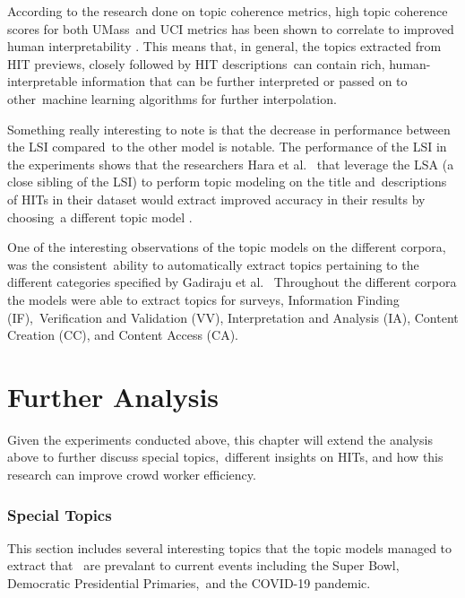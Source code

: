 \documentclass[letterpaper,12pt]{article}
\begin{document}
According to the research done on topic coherence metrics, high topic coherence scores for both UMass\
and UCI metrics has been shown to correlate to improved human interpretability \cite{mimno2011optimizing,newman2010automatic}.
This means that, in general, the topics extracted from HIT previews, closely followed by HIT descriptions\
can contain rich, human-interpretable information that can be further interpreted or passed on to other\
machine learning algorithms for further interpolation.

Something really interesting to note is that the decrease in performance between the LSI compared\
to the other model is notable. The performance of the LSI in the experiments shows that the researchers Hara et al. \
that leverage the LSA (a close sibling of the LSI) to perform topic modeling on the title and\
descriptions of HITs in their dataset would extract improved accuracy in their results by choosing\
a different topic model \cite{hara2018data}.

One of the interesting observations of the topic models on the different corpora, was the consistent\
ability to automatically extract topics pertaining to the different categories specified by Gadiraju et al. \cite{gadiraju2014taxonomy}\
Throughout the different corpora the models were able to extract topics for surveys, Information Finding (IF),\
Verification and Validation (VV), Interpretation and Analysis (IA), Content Creation (CC), and Content Access (CA).

\chapter{Further Analysis}
Given the experiments conducted above, this chapter will extend the analysis above to further discuss special topics,\
different insights on HITs, and how this research can improve crowd worker efficiency.

\subsection{Special Topics}
This section includes several interesting topics that the topic models managed to extract that \
are prevalant to current events including the Super Bowl, Democratic Presidential Primaries,\
and the COVID-19 pandemic.
\end{document}
